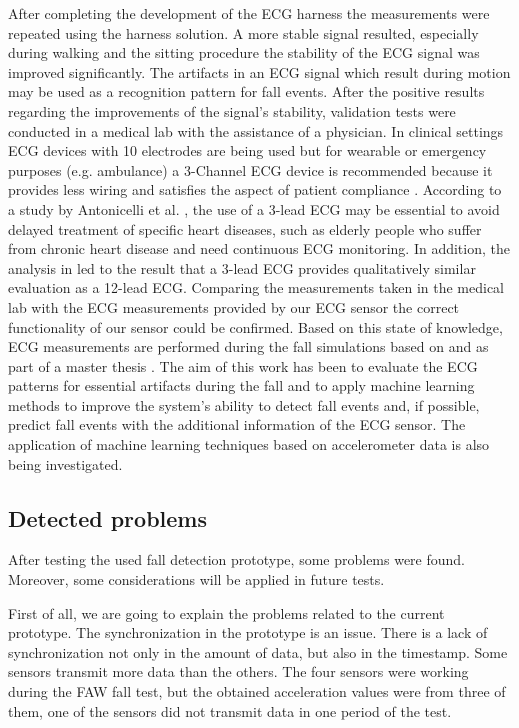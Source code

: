\documentclass[10pt,journal,compsoc]{IEEEtran}
\begin{document}
After completing the development of the ECG harness the measurements were repeated using the harness solution. A more stable signal resulted, especially during walking and the sitting procedure the stability of the ECG signal was improved significantly. The artifacts in an ECG signal which result during motion may be used as a recognition pattern for fall events. After the positive results regarding the improvements of the signal's stability, validation tests were conducted in a medical lab with the assistance of a physician. In clinical settings ECG devices with 10 electrodes are being used but for wearable or emergency purposes (e.g. ambulance) a 3-Channel ECG device is recommended because it provides less wiring and satisfies the aspect of patient compliance \cite{DrNicoletteWagner}. According to a study by Antonicelli et al. \cite{Antonicelli-ECG}, the use of a 3-lead ECG may be essential to avoid delayed treatment of specific heart diseases, such as elderly people who suffer from chronic heart disease and need continuous ECG monitoring. In addition, the analysis in \cite{Antonicelli-ECG} led to the result that a 3-lead ECG provides qualitatively similar evaluation as a 12-lead ECG. Comparing the measurements taken in the medical lab with the ECG measurements provided by our ECG sensor the correct functionality of our sensor could be confirmed. Based on this state of knowledge, ECG measurements are performed during the fall simulations based on \cite{Li2009} and \cite{Pannurat2014} as part of a master thesis \cite{FatimaMasterThesis}. The aim of this work has been to evaluate the ECG patterns for essential artifacts during the fall and to apply machine learning methods to improve the system's ability to detect fall events and, if possible, predict fall events with the additional information of the ECG sensor. The application of machine learning techniques based on accelerometer data is also being investigated. 

\subsection{Detected problems}
\label{sub:detectedproblems}

After testing the used fall detection prototype, some problems were 
found. Moreover, some considerations will be applied in future tests.

First of all, we are going to explain the problems related to the current prototype. The synchronization in the prototype is an issue. There is a lack of synchronization not only in the amount of data, but also in the timestamp. Some sensors transmit more data than the others. The four sensors were working during the FAW fall test, but the obtained acceleration values were from three of them, one of the sensors did not transmit data in one period of the test. 
\end{document}
